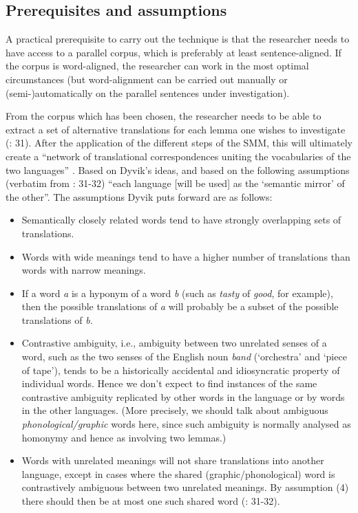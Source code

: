 \subsection{\label{sec:3.4.2}  Prerequisites and assumptions}

A practical prerequisite to carry out the technique is that the researcher needs to have access to a parallel corpus, which is preferably at least sentence-aligned. If the corpus is word-aligned, the researcher can work in the most optimal circumstances (but word-alignment can be carried out manually or (semi-)automatically on the parallel sentences under investigation).



From the corpus which has been chosen, the researcher needs to be able to extract a set of alternative translations for each lemma one wishes to investigate (\citealt{langemets_translations_2005}: 31). After the application of the different steps of the SMM, this will ultimately create a “network of translational correspondences uniting the vocabularies of the two languages” \citep[31]{langemets_translations_2005}. Based on Dyvik’s ideas, and based on the following assumptions (verbatim from \citealt{langemets_translations_2005}: 31-32) “each language [will be used] as the ‘semantic mirror’ of the other”. The assumptions Dyvik puts forward are as follows:


\begin{itemize}
\item
Semantically closely related words tend to have strongly overlapping sets of translations.
\item
Words with wide meanings tend to have a higher number of translations than words with narrow meanings.
\item
If a word \textit{a} is a hyponym of a word \textit{b} (such as \textit{tasty} of \textit{good}, for example), then the possible translations of \textit{a} will probably be a subset of the possible translations of \textit{b.}
\item
Contrastive ambiguity, i.e., ambiguity between two unrelated senses of a word, such as the two senses of the English noun \textit{band} (‘orchestra’ and ‘piece of tape’), tends to be a historically accidental and idiosyncratic property of individual words. Hence we don’t expect to find instances of the same contrastive ambiguity replicated by other words in the language or by words in the other languages. (More precisely, we should talk about ambiguous \textit{phonological/graphic} words here, since such ambiguity is normally analysed as homonymy and hence as involving two lemmas.)
\item
Words with unrelated meanings will not share translations into another language, except in cases where the shared (graphic/phonological) word is contrastively ambiguous between two unrelated meanings. By assumption (4) there should then be at most one such shared word (\citealt{langemets_translations_2005}: 31-32).
\end{itemize}

